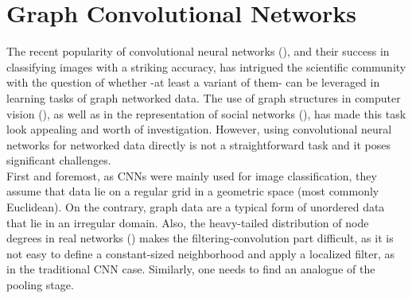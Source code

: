 \section{Graph Convolutional Networks}

The recent popularity of convolutional neural networks (\cite{krizhevsky2012imagenet}), and their
success in classifying images with a striking accuracy, has intrigued the scientific
community with the question of whether -at least a variant of them- can be leveraged in learning tasks
of graph networked data. The use of graph structures in computer
vision (\cite{shokoufandeh2000graph}), as well as in the representation of social networks
(\cite{easley2010networks}), has made this task look appealing and worth of investigation.
However, using convolutional neural networks for
networked data directly is not a straightforward task and it poses significant
challenges.\\

 First and foremost,
as CNNs were mainly used for image classification, they assume that
data lie on a regular grid in a geometric space (most commonly
Euclidean). On the contrary, graph data are a typical form of unordered data that lie in
an irregular domain. Also, the heavy-tailed distribution of node degrees
in real networks (\cite{faloutsos1999power}) makes the filtering-convolution part difficult,
as it is not easy to define a constant-sized neighborhood and apply a
localized filter, as in the traditional CNN case. Similarly, one needs to find an analogue of the pooling stage.\\


